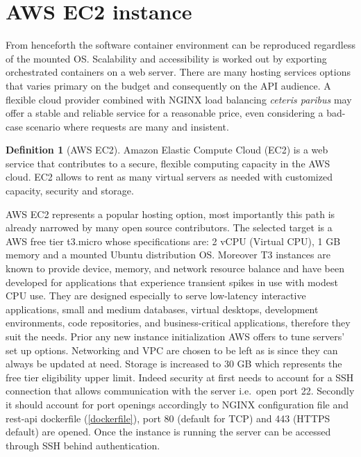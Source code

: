 \documentclass[
  12pt,
  a4paper,
  oneside]{book}
\theoremstyle{definition}
\newtheorem{definition}{Definition}[chapter]
\theoremstyle{definition}
\theoremstyle{definition}
\theoremstyle{remark}
\begin{document}
\hypertarget{aws}{%
\section{AWS EC2 instance}\label{aws}}

From henceforth the software container environment can be reproduced regardless of the mounted OS. Scalability and accessibility is worked out by exporting orchestrated containers on a web server. There are many hosting services options that varies primary on the budget and consequently on the API audience. A flexible cloud provider combined with NGINX load balancing \emph{ceteris paribus} may offer a stable and reliable service for a reasonable price, even considering a bad-case scenario where requests are many and insistent.
\begin{definition}[AWS EC2]
\protect\hypertarget{def:aws}{}{\label{def:aws} \iffalse (AWS EC2) \fi{} }Amazon Elastic Compute Cloud (EC2) is a web service that contributes to a secure, flexible computing capacity in the AWS cloud. EC2 allows to rent as many virtual servers as needed with customized capacity, security and storage.
\end{definition}

AWS EC2 represents a popular hosting option, most importantly this path is already narrowed by many open source contributors. The selected target is a AWS free tier t3.micro whose specifications are: 2 vCPU (Virtual CPU), 1 GB memory and a mounted Ubuntu distribution OS. Moreover T3 instances are known to provide device, memory, and network resource balance and have been developed for applications that experience transient spikes in use with modest CPU use. They are designed especially to serve low-latency interactive applications, small and medium databases, virtual desktops, development environments, code repositories, and business-critical applications, therefore they suit the needs.
Prior any new instance initialization AWS offers to tune servers' set up options. Networking and VPC are chosen to be left as is since they can always be updated at need. Storage is increased to 30 GB which represents the free tier eligibility upper limit. Indeed security at first needs to account for a SSH connection that allows communication with the server i.e.~open port 22. Secondly it should account for port openings accordingly to NGINX configuration file and rest-api dockerfile (\ref{dockerfile}), port 80 (default for TCP) and 443 (HTTPS default) are opened. Once the instance is running the server can be accessed through SSH behind authentication.
\end{document}
